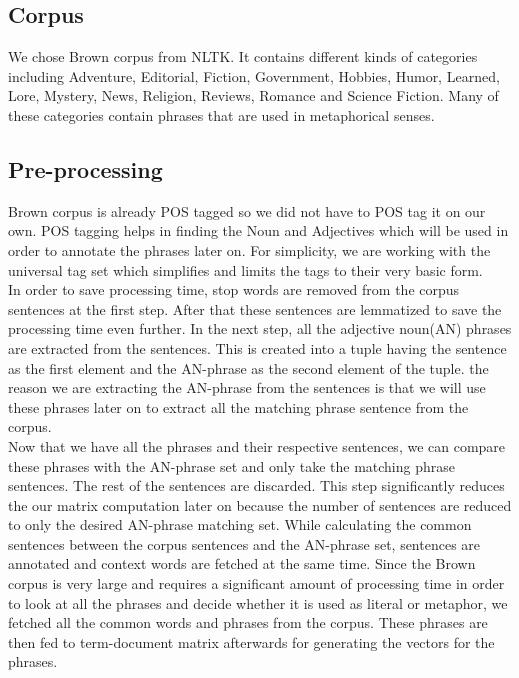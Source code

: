 \documentclass[a4paper]{article}
\begin{document}
\subsection{Corpus}
We chose Brown corpus from NLTK. It contains different kinds of categories including Adventure, Editorial, Fiction, Government, Hobbies, Humor, Learned, Lore, Mystery, News, Religion, Reviews, Romance and Science Fiction. Many of these categories contain phrases that are used in metaphorical senses. 

\subsection{Pre-processing}
Brown corpus is already POS tagged so we did not have to POS tag it on our own. POS tagging helps in finding the Noun and Adjectives which will be used in order to annotate the phrases later on. For simplicity, we are working with the universal tag set which simplifies and limits the tags to their very basic form.\\
In order to save processing time, stop words are removed from the corpus sentences at the first step. After that these sentences are lemmatized to save the processing time even further. In the next step, all the adjective noun(AN) phrases are extracted from the sentences. This is created into a tuple having the sentence as the first element and the AN-phrase as the second element of the tuple. the reason we are extracting the AN-phrase from the sentences is that we will use these phrases later on to extract all the matching phrase sentence from the corpus.\\
Now that we have all the phrases and their respective sentences, we can compare these phrases with the AN-phrase set and only take the matching phrase sentences. The rest of the sentences are discarded. This step significantly reduces the our matrix computation later on because the number of sentences are reduced to only the desired AN-phrase matching set. While calculating the common sentences between the corpus sentences and the AN-phrase set, sentences are annotated and context words are fetched at the same time. 
Since the Brown corpus is very large and requires a significant amount of processing time in order to look at all the phrases and decide whether it is used as literal or metaphor, we fetched all the common words and phrases from the corpus. These phrases are then fed to term-document matrix afterwards for generating the vectors for the phrases.
\end{document}
